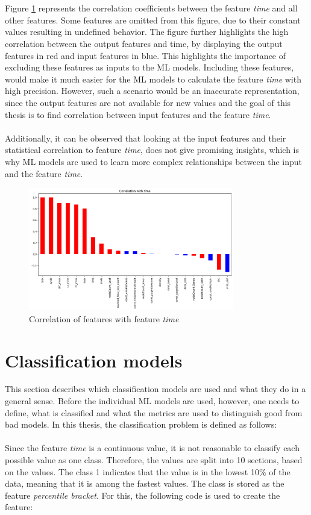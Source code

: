 \\\\
Figure \ref{fig:cortime} represents the correlation coefficients between the feature \textit{time} and all other features. Some features are omitted from this figure, due to their constant values resulting in undefined behavior. The figure further highlights the high correlation between the output features and time, by displaying the output features in red and input features in blue. This highlights the importance of excluding these features as inputs to the \ac{ML} models. Including these features, would make it much easier for the \ac{ML} models to calculate the feature \textit{time} with high precision. However, such a scenario would be an inaccurate representation, since the output features are not available for new values and the goal of this thesis is to find correlation between input features and the feature \textit{time}.  
\\\\
Additionally, it can be observed that looking at the input features and their statistical correlation to feature \textit{time}, does not give promising insights, which is why \ac{ML} models are used to learn more complex relationships between the input and the feature \textit{time}. 
\begin{figure}[H]
  \centering
  \includegraphics[width=0.8\textwidth]{images/correlation_with_time.png}
  \caption{Correlation of features with feature \textit{time}}
  \label{fig:cortime}
\end{figure}

\section{Classification models}
This section describes which classification models are used and what they do in a general sense. Before the individual \ac{ML} models are used, however, one needs to define, what is classified and what the metrics are used to distinguish good from bad models. In this thesis, the classification problem is defined as follows:
\\\\
Since the feature \textit{time} is a continuous value, it is not reasonable to classify each possible value as one class. Therefore, the values are split into 10 sections, based on the values. The class 1 indicates that the value is in the lowest 10\% of the data, meaning that it is among the fastest values. The class is stored as the feature \textit{percentile bracket}. For this, the following code is used to create the feature:

